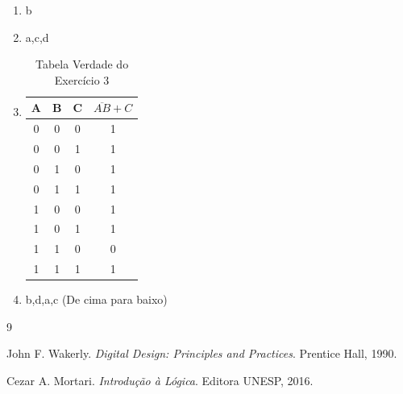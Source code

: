 \documentclass[12pt]{article}
\begin{document}
\begin{enumerate}
    \item b
    \item a,c,d
    \item
    \begin{table}[H]
    \centering
    \caption{Tabela Verdade do Exercício 3}
    \label{tab:tabela-autoav}
    \begin{tabular}{|c|c|c|c|}
        \hline
        A & B & C & \(\overline{AB} + C\)\\
        \hline
        0 & 0 & 0 & 1 \\
        \hline
        0 & 0 & 1 & 1 \\
        \hline
        0 & 1 & 0 & 1 \\
        \hline
        0 & 1 & 1 & 1 \\
        \hline
        1 & 0 & 0 & 1 \\
        \hline
        1 & 0 & 1 & 1 \\
        \hline
        1 & 1 & 0 & 0 \\
        \hline
        1 & 1 & 1 & 1 \\
        \hline
    \end{tabular}
    \end{table}
    \item b,d,a,c (De cima para baixo)
\end{enumerate}

\begin{thebibliography}{9}

John F. Wakerly.
\textit{Digital Design: Principles and Practices}.
Prentice Hall, 1990.

Cezar A. Mortari.
\textit{Introdução à Lógica}.
Editora UNESP, 2016.

\end{thebibliography}
\end{document}
